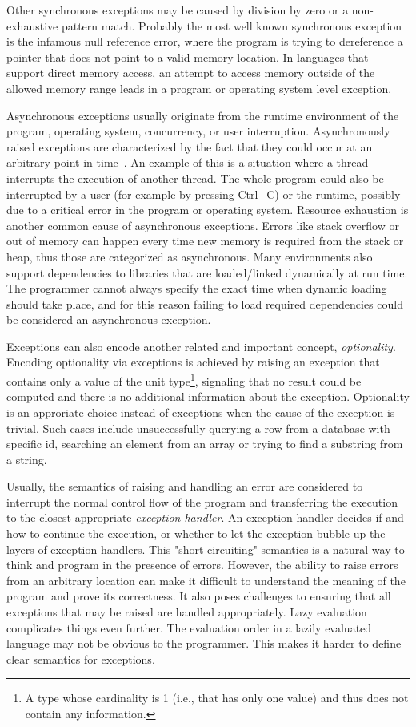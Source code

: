 Other synchronous exceptions may be caused by division by zero or a non-exhaustive pattern match. Probably the most well known synchronous exception is the infamous null reference error, where the program is trying to dereference a pointer that does not point to a valid memory location. In languages that support direct memory access, an attempt to access memory outside of the allowed memory range leads in a program or operating system level exception.~\cite{akward-squad}

Asynchronous exceptions usually originate from the runtime environment of the program, operating system, concurrency, or user interruption. Asynchronously raised exceptions are characterized by the fact that they could occur at an arbitrary point in time~\cite{async-exc}. An example of this is a situation where a thread interrupts the execution of another thread. The whole program could also be interrupted by a user (for example by pressing Ctrl+C) or the runtime, possibly due to a critical error in the program or operating system. Resource exhaustion is another common cause of asynchronous exceptions. Errors like stack overflow or out of memory can happen every time new memory is required from the stack or heap, thus those are categorized as asynchronous. Many environments also support dependencies to libraries that are loaded/linked  dynamically at run time. The programmer cannot always specify the exact time when dynamic loading should take place, and for this reason failing to load required dependencies could be considered an asynchronous exception.~\cite{akward-squad}

Exceptions can also encode another related and important concept, \emph{optionality}. Encoding optionality via exceptions is achieved by raising an exception that contains only a value of the unit type\footnote{A type whose cardinality is 1 (i.e., that has only one value) and thus does not contain any information.}, signaling that no result could be computed and there is no additional information about the exception. Optionality is an approriate choice instead of exceptions when the cause of the exception is trivial. Such cases include unsuccessfully querying a row from a database with specific id, searching an element from an array or trying to find a substring from a string.

Usually, the semantics of raising and handling an error are considered to interrupt the normal control flow of the program and transferring the execution to the closest appropriate \emph{exception handler}. An exception handler decides if and how to continue the execution, or whether to let the exception bubble up the layers of exception handlers. This "short-circuiting" semantics is a natural way to think and program in the presence of errors. However, the ability to raise errors from an arbitrary location can make it difficult to understand the meaning of the program and prove its correctness. It also poses challenges to ensuring that all exceptions that may be raised are handled appropriately. Lazy evaluation complicates things even further. The evaluation order in a lazily evaluated language may not be obvious to the programmer. This makes it harder to define clear semantics for exceptions.~\cite{imprecise-exceptions}

